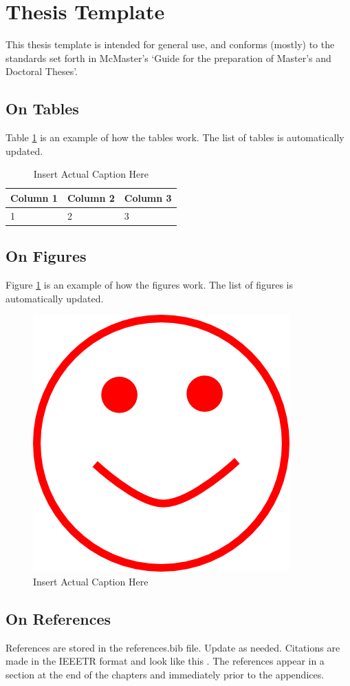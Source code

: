 
\section{Thesis Template}
This thesis template is intended for general use, and conforms (mostly) to the standards set forth in McMaster's `Guide for the preparation of Master's and Doctoral Theses'.

\subsection{On Tables}
Table \ref{tab:Generic_Table} is an example of how the tables work.  The list of tables is automatically updated.

\begin{center}
	\begin{table}[h]
		\centering		
		\caption[Insert LoT Caption Here]{Insert Actual Caption Here}
		\label{tab:Generic_Table}
		\begin{tabular}{m{3.5cm} m{3.5cm} m{3.5cm}}
		\hline		
		Column 1 & Column 2 & Column 3\\
		\hline		
		1 & 2 & 3 \\
		\hline
		\end{tabular}
	\end{table}
\end{center}

\subsection{On Figures}
Figure \ref{fig:Generic_Figure} is an example of how the figures work.  The list of figures is automatically updated.

\begin{figure}[h!]
	\centering
	\includegraphics[scale=0.95]{Chapter1/figures/temp.png}
	\caption[Insert LoF Caption Here]{Insert Actual Caption Here}
	\label{fig:Generic_Figure}
\end{figure}

\subsection{On References}
References are stored in the references.bib file.  Update as needed.  Citations are made in the IEEETR format and look like this \cite{leung13}.  The references appear in a section at the end of the chapters and immediately prior to the appendices.
